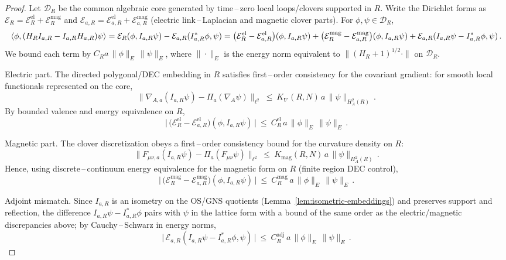 \documentclass[11pt]{amsart}
\theoremstyle{plain}
\theoremstyle{definition}
\theoremstyle{remark}
\begin{document}
\begin{proof}
Let $\mathcal D_R$ be the common algebraic core generated by time\,–\,zero local loops/clovers supported in $R$. Write the Dirichlet forms as $\mathcal E_R=\mathcal E_R^{\mathrm{el}}+\mathcal E_R^{\mathrm{mag}}$ and $\mathcal E_{a,R}=\mathcal E_{a,R}^{\mathrm{el}}+\mathcal E_{a,R}^{\mathrm{mag}}$ (electric link\,–\,Laplacian and magnetic clover parts). For $\phi,\psi\in\mathcal D_R$,
\[
  \langle \phi,(H_R I_{a,R}-I_{a,R} H_{a,R})\psi\rangle
   \\= \mathcal E_R(\phi, I_{a,R}\psi) - \mathcal E_{a,R}(I_{a,R}^*\phi,\psi)
   \\= \big(\mathcal E_R^{\mathrm{el}}-\mathcal E_{a,R}^{\mathrm{el}}\big)(\phi, I_{a,R}\psi)
      + \big(\mathcal E_R^{\mathrm{mag}}-\mathcal E_{a,R}^{\mathrm{mag}}\big)(\phi, I_{a,R}\psi)
      + \mathcal E_{a,R}(I_{a,R}\psi-I_{a,R}^*\phi,\psi)\,.
\]
We bound each term by $C_R a\,\|\phi\|_E\,\|\psi\|_E$, where $\|\cdot\|_E$ is the energy norm equivalent to $\|(H_R+1)^{1/2}\cdot\|$ on $\mathcal D_R$.

Electric part. The directed polygonal/DEC embedding in $R$ satisfies first\,–\,order consistency for the covariant gradient: for smooth local functionals represented on the core,
\[
  \big\|\nabla_{A,a}(I_{a,R}\psi) - \Pi_a(\nabla_A \psi)\big\|_{\ell^2}\ \le\ K_{\nabla}(R,N)\, a\, \|\psi\|_{H_A^2(R)}\,.
\]
By bounded valence and energy equivalence on $R$,
\[
  \big|\,\big(\mathcal E_R^{\mathrm{el}}-\mathcal E_{a,R}^{\mathrm{el}}\big)(\phi, I_{a,R}\psi)\,\big|
   \ \le\ C_R^{\mathrm{el}}\, a\, \|\phi\|_E\,\|\psi\|_E\,.
\]

Magnetic part. The clover discretization obeys a first\,–\,order consistency bound for the curvature density on $R$:
\[
  \big\|F_{\mu\nu,a}(I_{a,R}\psi) - \Pi_a(F_{\mu\nu}\psi)\big\|_{\ell^2}\ \le\ K_{\mathrm{mag}}(R,N)\, a\, \|\psi\|_{H_A^2(R)}\,.
\]
Hence, using discrete\,–\,continuum energy equivalence for the magnetic form on $R$ (finite region DEC control),
\[
  \big|\,\big(\mathcal E_R^{\mathrm{mag}}-\mathcal E_{a,R}^{\mathrm{mag}}\big)(\phi, I_{a,R}\psi)\,\big|
   \ \le\ C_R^{\mathrm{mag}}\, a\, \|\phi\|_E\,\|\psi\|_E\,.
\]

Adjoint mismatch. Since $I_{a,R}$ is an isometry on the OS/GNS quotients (Lemma~\ref{lem:isometric-embeddings}) and preserves support and reflection, the difference $I_{a,R}\psi-I_{a,R}^*\phi$ pairs with $\psi$ in the lattice form with a bound of the same order as the electric/magnetic discrepancies above; by Cauchy\,–\,Schwarz in energy norms,
\[
  \big|\,\mathcal E_{a,R}(I_{a,R}\psi-I_{a,R}^*\phi,\psi)\,\big|\ \le\ C_R^{\mathrm{adj}}\, a\, \|\phi\|_E\,\|\psi\|_E\,.
\]


\end{proof}
\end{document}
